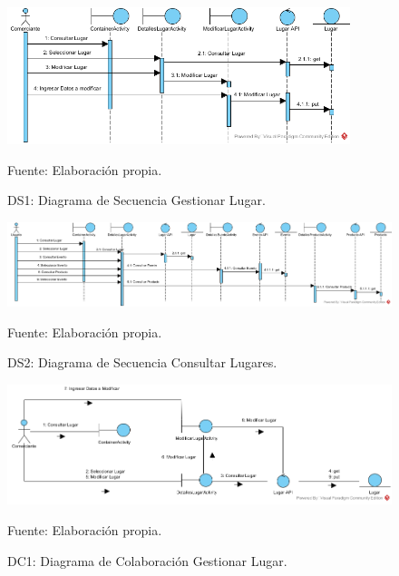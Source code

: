 \documentclass[12pt,letterpaper,openany]{book}
\begin{document}
\begin{figure}[H]
\begin{center}
\includegraphics[width=10cm]{./imagenes/DS/DS_gestionar_lugar}
\caption{DS1: Diagrama de Secuencia Gestionar Lugar.}
\centering Fuente: Elaboración propia.
\end{center}
\end{figure}

\begin{figure}[H]
\begin{center}
\includegraphics[width=14cm]{./imagenes/DS/DS_consultar_lugares}
\caption{DS2: Diagrama de Secuencia Consultar Lugares.}
\centering Fuente: Elaboración propia.
\end{center}
\end{figure}



\begin{figure}[H]
\begin{center}
\includegraphics[width=14cm]{./imagenes/DC/DC_gestionar_lugar}
\caption{DC1: Diagrama de Colaboración Gestionar Lugar.}
\centering Fuente: Elaboración propia.
\end{center}
\end{figure}
\end{document}
